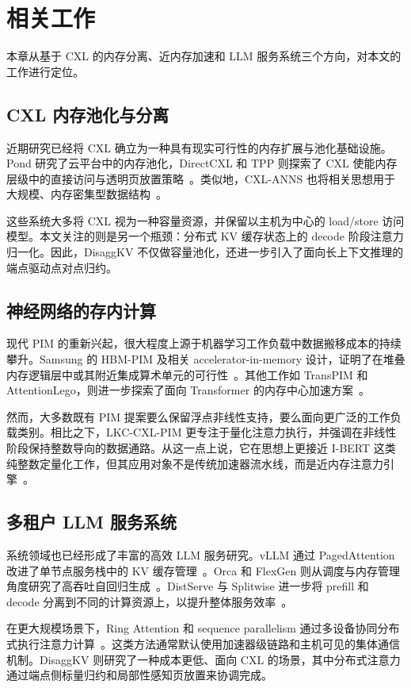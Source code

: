 \chapter{相关工作}
\label{ch:related_work}

本章从基于 CXL 的内存分离、近内存加速和 LLM 服务系统三个方向，对本文的工作进行定位。

\section{CXL 内存池化与分离}

近期研究已经将 CXL 确立为一种具有现实可行性的内存扩展与池化基础设施。Pond 研究了云平台中的内存池化，DirectCXL 和 TPP 则探索了 CXL 使能内存层级中的直接访问与透明页放置策略~\cite{cxl_pond, direct_cxl, tpp}。类似地，CXL-ANNS 也将相关思想用于大规模、内存密集型数据结构~\cite{cxl_anns}。

这些系统大多将 CXL 视为一种容量资源，并保留以主机为中心的 load/store 访问模型。本文关注的则是另一个瓶颈：分布式 KV 缓存状态上的 decode 阶段注意力归一化。因此，DisaggKV 不仅做容量池化，还进一步引入了面向长上下文推理的端点驱动点对点归约。

\section{神经网络的存内计算}

现代 PIM 的重新兴起，很大程度上源于机器学习工作负载中数据搬移成本的持续攀升。Samsung 的 HBM-PIM 及相关 accelerator-in-memory 设计，证明了在堆叠内存逻辑层中或其附近集成算术单元的可行性~\cite{samsung_pim, aim_samsung}。其他工作如 TransPIM 和 AttentionLego，则进一步探索了面向 Transformer 的内存中心加速方案~\cite{transpim, attentionlego}。

然而，大多数既有 PIM 提案要么保留浮点非线性支持，要么面向更广泛的工作负载类别。相比之下，LKC-CXL-PIM 更专注于量化注意力执行，并强调在非线性阶段保持整数导向的数据通路。从这一点上说，它在思想上更接近 I-BERT 这类纯整数定量化工作，但其应用对象不是传统加速器流水线，而是近内存注意力引擎~\cite{llm_int8, pim_quant, goliath}。

\section{多租户 LLM 服务系统}

系统领域也已经形成了丰富的高效 LLM 服务研究。vLLM 通过 PagedAttention 改进了单节点服务栈中的 KV 缓存管理~\cite{vllm}。Orca 和 FlexGen 则从调度与内存管理角度研究了高吞吐自回归生成~\cite{orca, flexgen}。DistServe 与 Splitwise 进一步将 prefill 和 decode 分离到不同的计算资源上，以提升整体服务效率~\cite{distserve, splitwise}。

在更大规模场景下，Ring Attention 和 sequence parallelism 通过多设备协同分布式执行注意力计算~\cite{ring_attention, seq_parallel}。这类方法通常默认使用加速器级链路和主机可见的集体通信机制。DisaggKV 则研究了一种成本更低、面向 CXL 的场景，其中分布式注意力通过端点侧标量归约和局部性感知页放置来协调完成。

